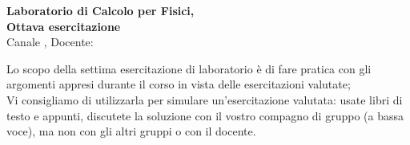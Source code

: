 \documentclass[11pt]{article}
\begin{document}
\pagestyle{empty}

\begin{center}
{\Large \bf  Laboratorio di Calcolo per Fisici,\\ Ottava esercitazione \\[2mm]}
{\large Canale \canale, Docente: \docente}
\end{center}
\vspace{4mm}

\begin{mdframed}[backgroundcolor=gray!10]
Lo scopo della settima esercitazione di laboratorio è di fare pratica con
gli argomenti appresi durante il corso in vista delle esercitazioni valutate;\\
Vi consigliamo di utilizzarla per simulare un'esercitazione valutata: usate libri di testo e appunti,
discutete la soluzione con il vostro compagno di gruppo (a bassa voce), ma non con gli altri gruppi o con il docente.
  \end{mdframed}
%
%
\end{document}
